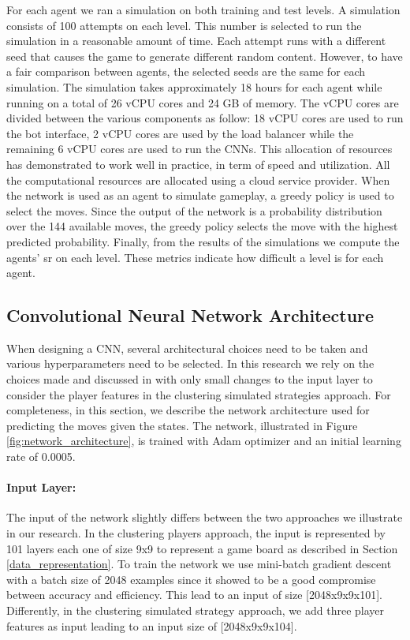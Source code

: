 For each agent we ran a simulation on both training and test levels. A simulation consists of 100 attempts on each level. This number is selected to run the simulation in a reasonable amount of time. Each attempt runs with a different seed that causes the game to generate different random content. However, to have a fair comparison between agents, the selected seeds are the same for each simulation. The simulation takes approximately 18 hours for each agent while running on a total of 26 \acf{vCPU} cores and 24 GB of memory. The \acs{vCPU} cores are divided between the various components as follow: 18 \acs{vCPU} cores are used to run the bot interface, 2 \acs{vCPU} cores are used by the load balancer while the remaining 6 \acs{vCPU} cores are used to run the \acsp{CNN}. This allocation of resources has demonstrated to work well in practice, in term of speed and utilization. All the computational resources are allocated using a cloud service provider.
When the network is used as an agent to simulate gameplay, a greedy policy is used to select the moves. Since the output of the network is a probability distribution over the 144 available moves, the greedy policy selects the move with the highest predicted probability. 
Finally, from the results of the simulations we compute the agents' \acs{sr} on each level. These metrics indicate how difficult a level is for each agent.


\subsection{Convolutional Neural Network Architecture}
When designing a \ac{CNN}, several architectural choices need to be taken and various hyperparameters need to be selected. In this research we rely on the choices made and discussed in \cite{eisen_simulating_2017} with only small changes to the input layer to consider the player features in the clustering simulated strategies approach. For completeness, in this section, we describe the network architecture used for predicting the moves given the states. The network, illustrated in Figure \ref{fig:network_architecture}, is trained with Adam optimizer \cite{kingma_adam:_2014} and an initial learning rate of 0.0005.

\paragraph{Input Layer:}
The input of the network slightly differs between the two approaches we illustrate in our research. In the clustering players approach, the input is represented by 101 layers each one of size 9x9 to represent a game board as described in Section \ref{data_representation}. To train the network we use mini-batch gradient descent with a batch size of 2048 examples since it showed to be a good compromise between accuracy and efficiency. This lead to an input of size [2048x9x9x101]. Differently, in the clustering simulated strategy approach, we add three player features as input leading to an input size of [2048x9x9x104].

